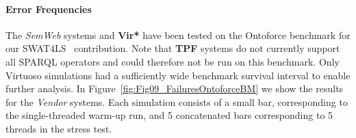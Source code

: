 %




%



\paragraph{Error Frequencies}

The \emph{SemWeb} systems and \textbf{Vir*} have been tested on the Ontoforce benchmark for our SWAT4LS~\cite{dewitte_swat4ls_2016} contribution. Note that \textbf{TPF} systems do not currently support all SPARQL operators and could therefore not be run on this benchmark. Only Virtuoso simulations had a sufficiently wide benchmark survival interval to enable further analysis. In Figure~\ref{fig:Fig09_FailuresOntoforceBM} we show the results for the \emph{Vendor} systems. Each simulation consists of a small bar, corresponding to the single-threaded warm-up run, and 5 concatenated bars corresponding to 5 threads in the stress test.

